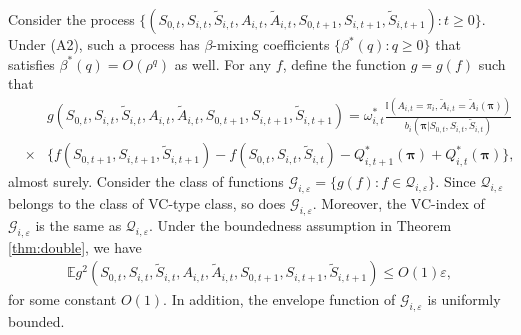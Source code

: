 \documentclass{article}
\newcommand{\Mean}{{\mathbb{E}}}
\begin{document}
Consider the process $\{(S_{0,t},S_{i,t},\widetilde{S}_{i,t},A_{i,t},\widetilde{A}_{i,t},S_{0,t+1},S_{i,t+1},\widetilde{S}_{i,t+1}):t\ge 0\}$. Under (A2), such a process has $\beta$-mixing coefficients $\{\beta^*(q):q\ge 0 \}$ that satisfies $\beta^*(q)=O(\rho^q)$ as well. For any $f$, define the function $g=g(f)$ such that
\begin{eqnarray*}
	&&g(S_{0,t},S_{i,t},\widetilde{S}_{i,t},A_{i,t},\widetilde{A}_{i,t},S_{0,t+1},S_{i,t+1},\widetilde{S}_{i,t+1})=\omega_{i,t}^*\frac{\mathbb{I}(A_{i,t}=\pi_i,\widetilde{A}_{i,t}=\widetilde{A}_i(\bm{\pi}))}{b_i(\bm{\pi}|S_{0,t},S_{i,t},\widetilde{S}_{i,t})}\\
	&\times &\{f(S_{0,t+1},S_{i,t+1},\widetilde{S}_{i,t+1})-f(S_{0,t},S_{i,t},\widetilde{S}_{i,t})
	-Q_{i,t+1}^*(\bm{\pi})+Q_{i,t}^*(\bm{\pi}) \},
\end{eqnarray*}
almost surely. Consider the class of functions $\mathcal{G}_{i,\varepsilon}=\{g(f):f\in \mathcal{Q}_{i,\varepsilon} \}$. Since $\mathcal{Q}_{i,\varepsilon}$ belongs to the class of VC-type class, so does $\mathcal{G}_{i,\varepsilon}$. Moreover, the VC-index of $\mathcal{G}_{i,\varepsilon}$ is the same as $\mathcal{Q}_{i,\varepsilon}$. Under the boundedness assumption in Theorem \ref{thm:double}, we have
\begin{eqnarray*}
	\Mean g^2(S_{0,t},S_{i,t},\widetilde{S}_{i,t},A_{i,t},\widetilde{A}_{i,t},S_{0,t+1},S_{i,t+1},\widetilde{S}_{i,t+1})\le O(1) \varepsilon,
\end{eqnarray*}
for some constant $O(1)$. In addition, the envelope function of $\mathcal{G}_{i,\varepsilon}$ is uniformly bounded. 
\end{document}
